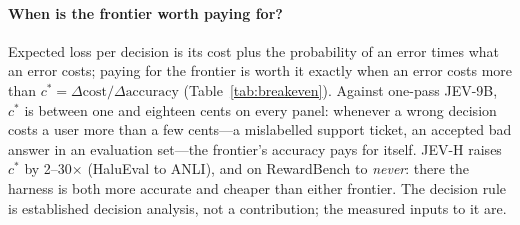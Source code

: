 \paragraph{When is the frontier worth paying for?}

Expected loss per decision is its cost plus the probability of an error times what an error costs; paying for the frontier is worth it exactly when an error costs more than $c^*=\Delta\text{cost}/\Delta\text{accuracy}$ (Table~\ref{tab:breakeven}).
Against one-pass JEV-9B, $c^*$ is between one and eighteen cents on every panel: whenever a wrong decision costs a user more than a few cents---a mislabelled support ticket, an accepted bad answer in an evaluation set---the frontier's accuracy pays for itself.
JEV-H raises $c^*$ by 2--30$\times$ (HaluEval to ANLI), and on RewardBench to \emph{never}: there the harness is both more accurate and cheaper than either frontier.
The decision rule is established decision analysis, not a contribution; the measured inputs to it are.
